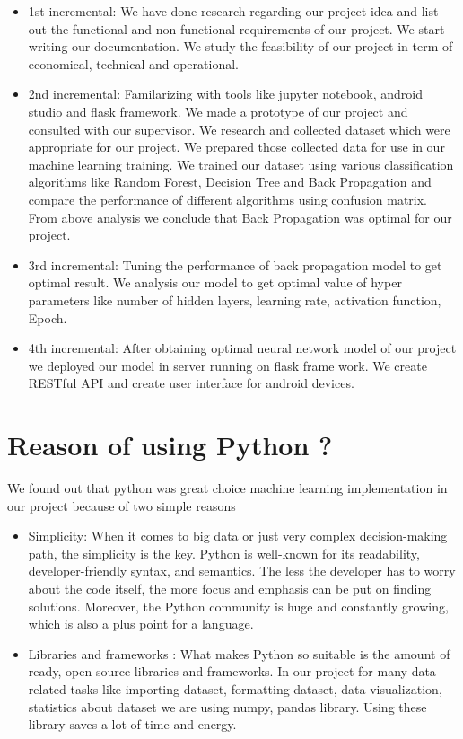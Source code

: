 \begin{itemize}

\item 1st incremental: We have done research regarding our project idea and list out the functional and non-functional requirements of our project. We start writing our documentation. We study the feasibility of our project in term of economical, technical and operational.

\item 2nd incremental: Familarizing with tools like jupyter notebook, android studio and flask framework. We made a prototype of our project and consulted with our supervisor. We research and collected dataset which were appropriate for our project. We prepared those collected data for use in our machine learning training. We trained our dataset using various classification algorithms like Random Forest, Decision Tree and Back Propagation and compare the performance of different algorithms using confusion matrix. From above analysis we conclude that Back Propagation was optimal for our project.

\item 3rd incremental: Tuning the performance of back propagation model to get optimal result. We analysis our model to get optimal value of hyper parameters like number of hidden layers, learning rate, activation function, Epoch.

\item 4th incremental: After obtaining optimal neural network model of our project we deployed our model in server running on flask frame work. We create RESTful API and create user interface for android devices.

\end{itemize}




\section{Reason of using  Python ?}
We found out that python was great choice machine learning implementation in our project because of two simple reasons
\begin{itemize}
\item Simplicity: When it comes to big data or just very complex decision-making path, the simplicity is the key. Python is well-known for its readability, developer-friendly syntax, and semantics. The less the developer has to worry about the code itself, the more focus and emphasis can be put on finding solutions. Moreover, the Python community is huge and constantly growing, which is also a plus point for a language.
\item Libraries and frameworks : What makes Python so suitable is the amount of ready, open source libraries and frameworks. In our project for many data related tasks like importing dataset, formatting dataset, data visualization, statistics about dataset we are using numpy, pandas library. Using these library saves a lot of time and energy.

\end{itemize}



